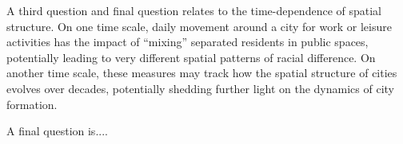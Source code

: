A third question and final question relates to the time-dependence of spatial structure. On one time scale, daily movement around a city for work or leisure activities has the impact of ``mixing'' separated residents in public spaces, potentially leading to very different spatial patterns of racial difference. On another time scale, these measures may track how the spatial structure of cities evolves over decades, potentially shedding further light on the dynamics of city formation. 

A final question is....